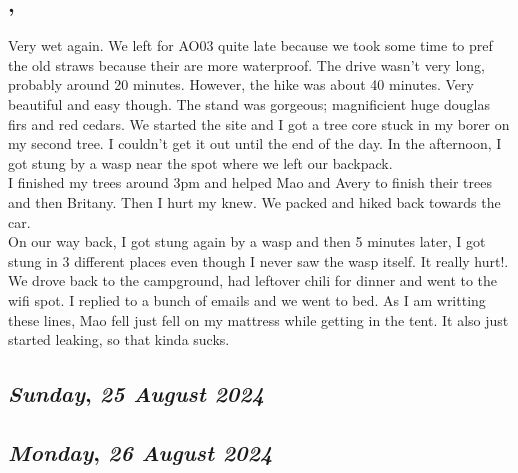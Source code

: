 \subsection*{\weekday, \day}
Very wet again. We left for AO03 quite late because we took some time to pref the old straws because their are more waterproof. The drive wasn't very long, probably around 20 minutes. However, the hike was about 40 minutes. Very beautiful and easy though. The stand was gorgeous; magnificient huge douglas firs and red cedars. We started the site and I got a tree core stuck in my borer on my second tree. I couldn't get it out until the end of the day. In the afternoon, I got stung by a wasp near the spot where we left our backpack.\\
I finished my trees around 3pm and helped Mao and Avery to finish their trees and then Britany. Then I hurt my knew. We packed and hiked back towards the car. \\
On our way back, I got stung again by a wasp and then 5 minutes later, I got stung in 3 different places even though I never saw the wasp itself. It really hurt!. \\
We drove back to the campground, had leftover chili for dinner and went to the wifi spot. I replied to a bunch of emails and we went to bed. As I am writting these lines, Mao fell just fell on my mattress while getting in the tent. It also just started leaking, so that kinda sucks.

\def\day{\textit{25 August 2024}}
\def\weekday{\textit{Sunday}}
\subsection*{\weekday, \day}

\def\day{\textit{26 August 2024}}
\def\weekday{\textit{Monday}}
\subsection*{\weekday, \day}

\def\day{\textit{27 August 2024}}
\def\weekday{\textit{Tuesday}}
